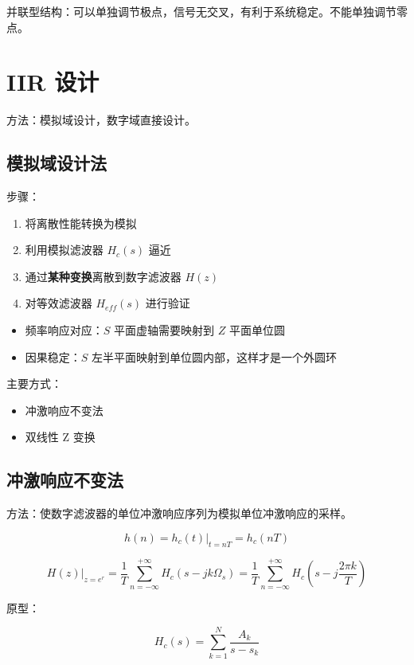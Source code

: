 \documentclass[cn,11pt,chinese,black,simple]{elegantbook}
\begin{document}
并联型结构：可以单独调节极点，信号无交叉，有利于系统稳定。不能单独调节零点。

\section{IIR 设计}

方法：模拟域设计，数字域直接设计。

\subsection{模拟域设计法}

步骤：

\begin{enumerate}
    \item 将离散性能转换为模拟
    \item 利用模拟滤波器 \(H_c(s)\) 逼近
    \item 通过\textbf{某种变换}离散到数字滤波器 \(H(z)\) 
    \item 对等效滤波器 \(H_{eff}(s)\) 进行验证
\end{enumerate}

\begin{itemize}
    \item 频率响应对应：\(S\) 平面虚轴需要映射到 \(Z\) 平面单位圆
    \item 因果稳定：\(S\) 左半平面映射到单位圆内部，这样才是一个外圆环
\end{itemize}

主要方式：

\begin{itemize}
    \item 冲激响应不变法
    \item 双线性 Z 变换
\end{itemize}


\subsection{冲激响应不变法}


方法：使数字滤波器的单位冲激响应序列为模拟单位冲激响应的采样。


\[
h(n)=\left.h_{c}(t)\right|_{t=n T}=h_{c}(n T)
\]

\[
\left.H(z)\right|_{z=e^{r}}=\frac{1}{T} \sum_{n=-\infty}^{+\infty} H_{c}\left(s-j k \Omega_{s}\right)=\frac{1}{T} \sum_{n=-\infty}^{+\infty} H_{c}\left(s-j \frac{2 \pi k}{T}\right)
\]


原型：

\[
H_{c}(s)=\sum_{k=1}^{N} \frac{A_{k}}{s-s_{k}}
\]
\end{document}
